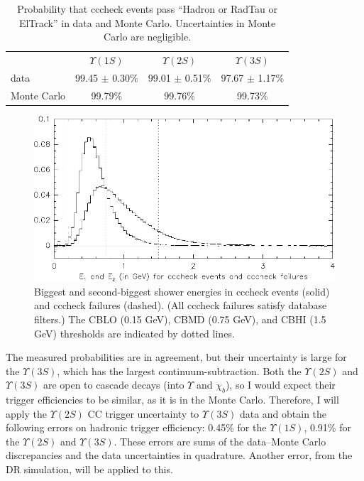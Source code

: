 \begin{table}[p]
  \caption{\label{trigger_neutraltable} Probability that cccheck
  events pass ``Hadron or RadTau or ElTrack'' in data and Monte
  Carlo.  Uncertainties in Monte Carlo are negligible.}
  \begin{center}
    \begin{tabular}{l c c c}
      & $\Upsilon(1S)$ & $\Upsilon(2S)$ & $\Upsilon(3S)$ \\
      data & 99.45 $\pm$ 0.30\% & 99.01 $\pm$ 0.51\% & 97.67 $\pm$ 1.17\% \\
      Monte Carlo & 99.79\% & 99.76\% & 99.73\% \\
    \end{tabular}
  \end{center}
\end{table}

\begin{figure}[p]
  \begin{center}
    \includegraphics[width=\linewidth]{plots/trigger_neutralpart}
  \end{center}
  \caption{\label{trigger_neutralpart} Biggest and second-biggest
    shower energies in cccheck events (solid) and cccheck failures
    (dashed).  (All cccheck failures satisfy database filters.)  The
    CBLO (0.15 GeV), CBMD (0.75 GeV), and CBHI (1.5 GeV) thresholds
    are indicated by dotted lines.}
\end{figure}

The measured probabilities are in agreement, but their uncertainty is
large for the $\Upsilon(3S)$, which has the largest
continuum-subtraction.  Both the $\Upsilon(2S)$ and $\Upsilon(3S)$ are
open to cascade decays (into $\Upsilon$ and $\chi_b$), so I would
expect their trigger efficiencies to be similar, as it is in the Monte
Carlo.  Therefore, I will apply the $\Upsilon(2S)$ CC trigger
uncertainty to $\Upsilon(3S)$ data and obtain the following errors on
hadronic trigger efficiency: 0.45\% for the $\Upsilon(1S)$, 0.91\% for
the $\Upsilon(2S)$ and $\Upsilon(3S)$.  These errors are sums of the
data--Monte Carlo discrepancies and the data uncertainties in
quadrature.  Another error, from the DR simulation, will be applied to
this.

